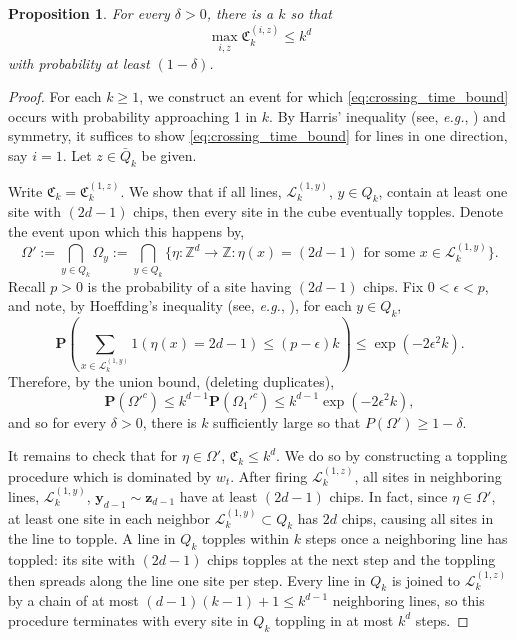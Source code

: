 \documentclass[aap]{imsart}
\newcommand{\Z}{\mathbb{Z}}
\newcommand{\eg}{{\it e.g.}}
\newtheorem{prop}{Proposition}[section]
\begin{document}
\begin{prop} \label{prop:crossing_time}
	For every $\delta > 0$, there is a $k$ so that  
	\begin{equation} \label{eq:crossing_time_bound}
	\max_{i,z} \mathfrak{C}_{k}^{(i,z)} \leq k^d
	\end{equation}
	with probability at least $(1-\delta)$. 
\end{prop}
\begin{proof}
	For each $k \geq 1$, we construct an event for which \eqref{eq:crossing_time_bound} occurs 
	with probability approaching 1 in $k$.  By Harris' inequality (see, \eg, \cite{alon2016probabilistic}) and symmetry,
	it suffices to show \eqref{eq:crossing_time_bound} for lines in one direction, say $i=1$.
	Let $z \in \bar{Q}_k$ be given. 
	
	Write $\mathfrak{C}_k =  \mathfrak{C}_k^{(1,z)}$.  We show that if all lines, $\mathcal{L}_k^{(1,y)}$, $y \in Q_k$, contain at least one 
	site with $(2 d - 1)$ chips, then every site in the cube eventually topples.  Denote the event upon which this happens by, 
	\begin{equation}
	\Omega' := \bigcap_{y \in Q_k} \Omega_y := \bigcap_{y \in Q_k} \{\eta:\Z^d \to \Z : \eta(x) = (2 d-1) \mbox{ for some $x \in \mathcal{L}_k^{(1,y)}$} \}.
	\end{equation}
	Recall $p > 0$ is the probability of a site having $(2 d-1)$ chips. Fix $0 < \epsilon < p$, and note, by Hoeffding's inequality (see, \eg, \cite{alon2016probabilistic}), 
	for each $y \in Q_k$, 
	\[
	\mathbf{P}( \sum_{ x \in \mathcal{L}_k^{(1,y)} }  1(\eta(x) = 2 d -1) \leq (p-\epsilon) k) \leq  \exp(-2 \epsilon^2 k).
	\]
	Therefore, by the union bound, (deleting duplicates),
	\[
	\mathbf{P}(\Omega'^c) \leq k^{d-1} \mathbf{P}(\Omega_1'^c) \leq k^{d-1} \exp(-2 \epsilon^2 k),
	\]
	and so for every $\delta > 0$, there is $k$ sufficiently large so that 
	$P(\Omega') \geq 1 - \delta$.
	
	It remains to check that for $\eta \in \Omega'$, $\mathfrak{C}_k \leq k^d$. We do so by constructing a toppling procedure which is dominated by $w_t$. After firing $\mathcal{L}_k^{(1,z)}$, all sites in neighboring lines, $\mathcal{L}_k^{(1,y)}$, $\mathbf{y}_{d-1} \sim \mathbf{z}_{d-1}$ have at least $(2 d - 1)$ chips. In fact, since $\eta \in \Omega'$, at least one site in each neighbor 
	$\mathcal{L}_k^{(1,y)} \subset Q_k$ has $2 d $ chips, causing all sites in the line to topple. A line in $Q_k$ topples within $k$ steps once a neighboring line has toppled: its site with $(2d-1)$ chips topples at the next step and the toppling then spreads along the line one site per step. Every line in $Q_k$ is joined to $\mathcal{L}_k^{(1,z)}$ by a chain of at most $(d-1)(k-1) + 1 \leq k^{d-1}$ neighboring lines, so this procedure terminates with every site in $Q_k$ toppling in at most $k^{d}$ steps. 
	
\end{proof}
\end{document}

